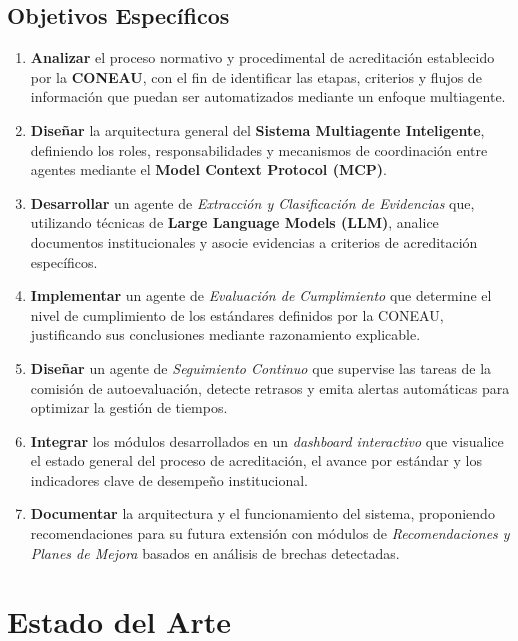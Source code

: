 \documentclass[12pt]{article}
\begin{document}
\subsection{Objetivos Específicos}

\begin{enumerate}
    \item \textbf{Analizar} el proceso normativo y procedimental de acreditación establecido por la \textbf{CONEAU}, con el fin de identificar las etapas, criterios y flujos de información que puedan ser automatizados mediante un enfoque multiagente.
    
    \item \textbf{Diseñar} la arquitectura general del \textbf{Sistema Multiagente Inteligente}, definiendo los roles, responsabilidades y mecanismos de coordinación entre agentes mediante el \textbf{Model Context Protocol (MCP)}.
    
    \item \textbf{Desarrollar} un agente de \textit{Extracción y Clasificación de Evidencias} que, utilizando técnicas de \textbf{Large Language Models (LLM)}, analice documentos institucionales y asocie evidencias a criterios de acreditación específicos.
    
    \item \textbf{Implementar} un agente de \textit{Evaluación de Cumplimiento} que determine el nivel de cumplimiento de los estándares definidos por la CONEAU, justificando sus conclusiones mediante razonamiento explicable.
    
    \item \textbf{Diseñar} un agente de \textit{Seguimiento Continuo} que supervise las tareas de la comisión de autoevaluación, detecte retrasos y emita alertas automáticas para optimizar la gestión de tiempos.
    
    \item \textbf{Integrar} los módulos desarrollados en un \textit{dashboard interactivo} que visualice el estado general del proceso de acreditación, el avance por estándar y los indicadores clave de desempeño institucional.
    
    \item \textbf{Documentar} la arquitectura y el funcionamiento del sistema, proponiendo recomendaciones para su futura extensión con módulos de \textit{Recomendaciones y Planes de Mejora} basados en análisis de brechas detectadas.
\end{enumerate}

\section*{Estado del Arte}
\end{document}
